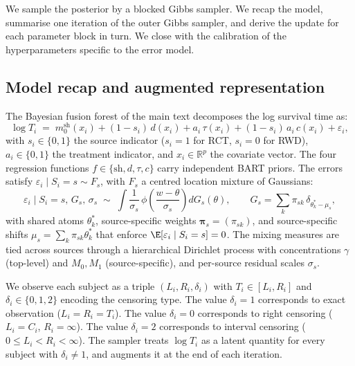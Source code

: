 We sample the posterior by a blocked Gibbs sampler.
We recap the model, summarise one iteration of the outer Gibbs sampler, and derive the update for each parameter block in turn.
We close with the calibration of the hyperparameters specific to the error model.

\subsection{Model recap and augmented representation}

The Bayesian fusion forest of the main text decomposes the log survival time as:
\begin{equation}
\log T_i \;=\; m_0^{\mathrm{sh}}(x_i) + (1 - s_i)\, d(x_i) + a_i\, \tau(x_i) + (1 - s_i)\, a_i\, c(x_i) + \varepsilon_i,
\label{eq:sm-aft}
\end{equation}
with $s_i \in \{0, 1\}$ the source indicator ($s_i = 1$ for RCT, $s_i = 0$ for RWD), $a_i \in \{0, 1\}$ the treatment indicator, and $x_i \in \mathbb{R}^p$ the covariate vector.
The four regression functions $f \in \{\mathrm{sh}, d, \tau, c\}$ carry independent BART priors.
The errors satisfy $\varepsilon_i \mid S_i = s \sim F_s$, with $F_s$ a centred location mixture of Gaussians:
\begin{equation}
\varepsilon_i \mid S_i = s,\, G_s,\, \sigma_s \;\sim\; \int \frac{1}{\sigma_s}\, \phi\!\left(\frac{w - \theta}{\sigma_s}\right) dG_s(\theta), \qquad G_s = \sum_{k} \pi_{sk}\, \delta_{\theta_k^* - \mu_s},
\end{equation}
with shared atoms $\theta_k^*$, source-specific weights $\bm{\pi}_s = (\pi_{sk})$, and source-specific shifts $\mu_s = \sum_k \pi_{sk} \theta_k^*$ that enforce $\E[\varepsilon_i \mid S_i = s] = 0$.
The mixing measures are tied across sources through a hierarchical Dirichlet process with concentrations $\gamma$ (top-level) and $M_0, M_1$ (source-specific), and per-source residual scales $\sigma_s$.

We observe each subject as a triple $(L_i, R_i, \delta_i)$ with $T_i \in [L_i, R_i]$ and $\delta_i \in \{0, 1, 2\}$ encoding the censoring type.
The value $\delta_i = 1$ corresponds to exact observation ($L_i = R_i = T_i$).
The value $\delta_i = 0$ corresponds to right censoring ($L_i = C_i$, $R_i = \infty$).
The value $\delta_i = 2$ corresponds to interval censoring ($0 \leq L_i < R_i < \infty$).
The sampler treats $\log T_i$ as a latent quantity for every subject with $\delta_i \neq 1$, and augments it at the end of each iteration.

